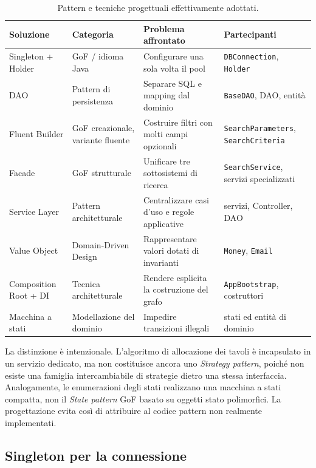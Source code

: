 \documentclass[12pt,a4paper]{article}
\newcommand{\code}[1]{\nolinkurl{#1}}
\begin{document}
\begin{table}[H]
\centering
\small
{}
\begin{tabular}{p{3.0cm}p{2.8cm}p{4.2cm}p{3.4cm}}
\toprule
\textbf{Soluzione} & \textbf{Categoria} & \textbf{Problema affrontato} &
\textbf{Partecipanti} \\
\midrule
Singleton + Holder & GoF / idioma Java &
Configurare una sola volta il pool &
\code{DBConnection}, \code{Holder} \\
DAO & Pattern di persistenza &
Separare SQL e mapping dal dominio &
\code{BaseDAO}, DAO, entità \\
Fluent Builder & GoF creazionale, variante fluente &
Costruire filtri con molti campi opzionali &
\code{SearchParameters}, \code{SearchCriteria} \\
Facade & GoF strutturale &
Unificare tre sottosistemi di ricerca &
\code{SearchService}, servizi specializzati \\
Service Layer & Pattern architetturale &
Centralizzare casi d'uso e regole applicative &
servizi, Controller, DAO \\
Value Object & Domain-Driven Design &
Rappresentare valori dotati di invarianti &
\code{Money}, \code{Email} \\
Composition Root + DI & Tecnica architetturale &
Rendere esplicita la costruzione del grafo &
\code{AppBootstrap}, costruttori \\
Macchina a stati & Modellazione del dominio &
Impedire transizioni illegali &
stati ed entità di dominio \\
\bottomrule
\end{tabular}
\caption{Pattern e tecniche progettuali effettivamente adottati.}
\label{tab:patterns}
\end{table}

La distinzione è intenzionale. L'algoritmo di allocazione dei tavoli è
incapsulato in un servizio dedicato, ma non costituisce ancora uno
\emph{Strategy pattern}, poiché non esiste una famiglia intercambiabile di
strategie dietro una stessa interfaccia. Analogamente, le enumerazioni degli
stati realizzano una macchina a stati compatta, non il \emph{State pattern} GoF
basato su oggetti stato polimorfici. La progettazione evita così di attribuire
al codice pattern non realmente implementati.

\subsection{Singleton per la connessione}
\end{document}
